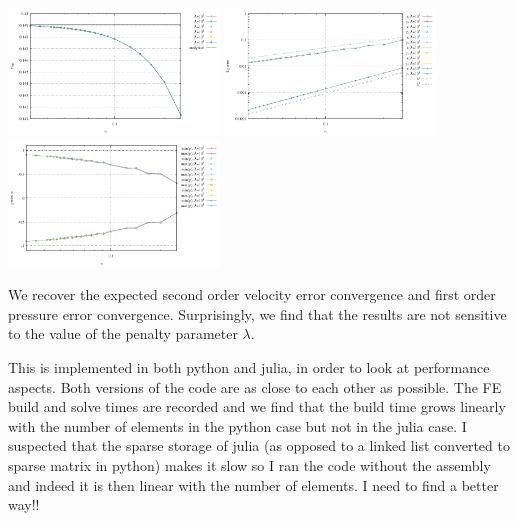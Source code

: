 \begin{center}
\includegraphics[width=5.6cm]{python_codes/fieldstone_10/results/exp5/vrms}
\includegraphics[width=5.6cm]{python_codes/fieldstone_10/results/exp5/conv}
\includegraphics[width=5.6cm]{python_codes/fieldstone_10/results/exp5/p_stats}
\end{center}
We recover the expected second order velocity error convergence 
and first order pressure error convergence. 
Surprisingly, we find that the results are not sensitive to the value of the penalty parameter $\lambda$.

This \stone is implemented in both python and julia, in order to look at
performance aspects. Both versions of the code are as close to each other 
as possible. The FE build and solve times are recorded and we find
that the build time grows linearly with the number of elements in the python 
case but not in the julia case. I suspected that the sparse storage of julia
(as opposed to a linked list converted to sparse matrix in python) makes it slow
so I ran the code without the assembly and indeed it is then linear with the 
number of elements.
I need to find a better way!!

